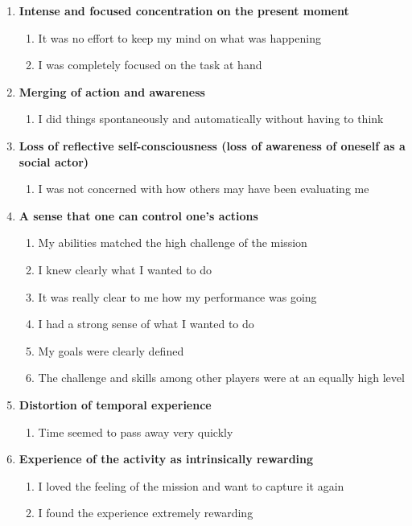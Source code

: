 \renewcommand{\labelenumiii}{\Roman{enumii}}
\begin{enumerate}
   \item \textbf{Intense and focused concentration on the present moment}
   \begin{enumerate}
     \item It was no effort to keep my mind on what was happening
     \item I was completely focused on the task at hand
   \end{enumerate}
   \item \textbf{Merging of action and awareness}
   \begin{enumerate}
     \item I did things spontaneously and automatically without having to think
   \end{enumerate}
   \item \textbf{Loss of reflective self-consciousness (loss of awareness of oneself as a social actor)}
   \begin{enumerate}
     \item I was not concerned with how others may have been evaluating me
   \end{enumerate}
   \item \textbf{A sense that one can control one's actions}
   \begin{enumerate}
     \item My abilities matched the high challenge of the mission
     \item I knew clearly what I wanted to do
	 \item It was really clear to me how my performance was going
	 \item I had a strong sense of what I wanted to do
	 \item My goals were clearly defined
	 \item The challenge and skills among other players were at an equally high level
   \end{enumerate}
   \item \textbf{Distortion of temporal experience}
   \begin{enumerate}
     \item Time seemed to pass away very quickly
   \end{enumerate}
   \item \textbf{Experience of the activity as intrinsically rewarding}
   \begin{enumerate}
     \item I loved the feeling of the mission and want to capture it again
     \item I found the experience extremely rewarding
   \end{enumerate}
\end{enumerate}

